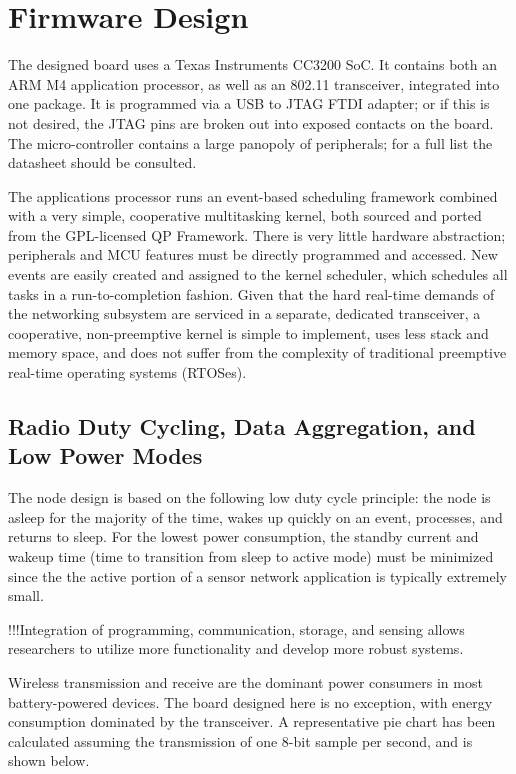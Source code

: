 \chapter{Firmware Design}

The designed board uses a Texas Instruments CC3200 SoC. It contains both an ARM M4 application processor, as well as an 802.11 transceiver, integrated into one package. It is programmed via a USB to JTAG FTDI adapter; or if this is not desired, the JTAG pins are broken out into exposed contacts on the board. The micro-controller contains a large panopoly of peripherals; for a full list the datasheet should be consulted.

The applications processor runs an event-based scheduling framework combined with a very simple, cooperative multitasking kernel, both sourced and ported from the GPL-licensed QP Framework. There is very little hardware abstraction; peripherals and MCU features must be directly programmed and accessed. New events are easily created and assigned to the kernel scheduler, which schedules all tasks in a run-to-completion fashion. Given that the hard real-time demands of the networking subsystem are serviced in a separate, dedicated transceiver, a cooperative, non-preemptive kernel is simple to implement, uses less stack and memory space, and does not suffer from the complexity of traditional preemptive real-time operating systems (RTOSes).
 
\section{Radio Duty Cycling, Data Aggregation, and Low Power Modes}

The node design is based on the following low duty cycle principle: the node is asleep for the majority of the time, wakes up quickly on an event, processes, and returns to sleep. For the lowest power consumption, the standby current and wakeup time (time to transition from sleep to active mode) must be minimized\cite{puccinelli2005wireless} since the the active portion of a sensor network application is typically extremely small\cite{shnayder2004simulating}. 

!!!Integration of programming, communication, storage, and sensing allows researchers to utilize more functionality and develop more robust systems.


Wireless transmission and receive are the dominant power consumers in most battery-powered devices. The board designed here is no exception, with energy consumption dominated by the transceiver. A representative pie chart has been calculated assuming the transmission of one 8-bit sample per second, and is shown below.


